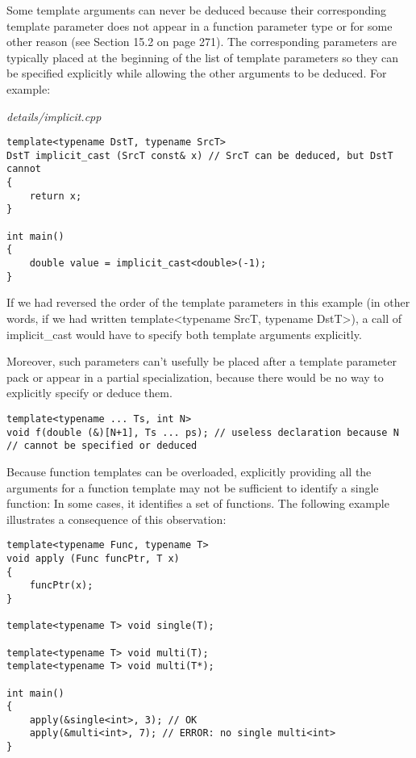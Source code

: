 Some template arguments can never be deduced because their corresponding template parameter does not appear in a function parameter type or for some other reason (see Section 15.2 on page 271). The corresponding parameters are typically placed at the beginning of the list of template parameters so they can be specified explicitly while allowing the other arguments to be deduced. For example:

\noindent
\textit{details/implicit.cpp}
\begin{lstlisting}[style=styleCXX]
template<typename DstT, typename SrcT>
DstT implicit_cast (SrcT const& x) // SrcT can be deduced, but DstT cannot
{
	return x;
}

int main()
{
	double value = implicit_cast<double>(-1);
}
\end{lstlisting}

If we had reversed the order of the template parameters in this example (in other words, if we had written template<typename SrcT, typename DstT>), a call of implicit\_cast would have to specify both template arguments explicitly.

Moreover, such parameters can’t usefully be placed after a template parameter pack or appear in a partial specialization, because there would be no way to explicitly specify or deduce them.

\begin{lstlisting}[style=styleCXX]
template<typename ... Ts, int N>
void f(double (&)[N+1], Ts ... ps); // useless declaration because N
// cannot be specified or deduced
\end{lstlisting}

Because function templates can be overloaded, explicitly providing all the arguments for a function template may not be sufficient to identify a single function: In some cases, it identifies a set of functions. The following example illustrates a consequence of this observation:

\begin{lstlisting}[style=styleCXX]
template<typename Func, typename T>
void apply (Func funcPtr, T x)
{
	funcPtr(x);
}

template<typename T> void single(T);

template<typename T> void multi(T);
template<typename T> void multi(T*);

int main()
{
	apply(&single<int>, 3); // OK
	apply(&multi<int>, 7); // ERROR: no single multi<int>
}
\end{lstlisting}

